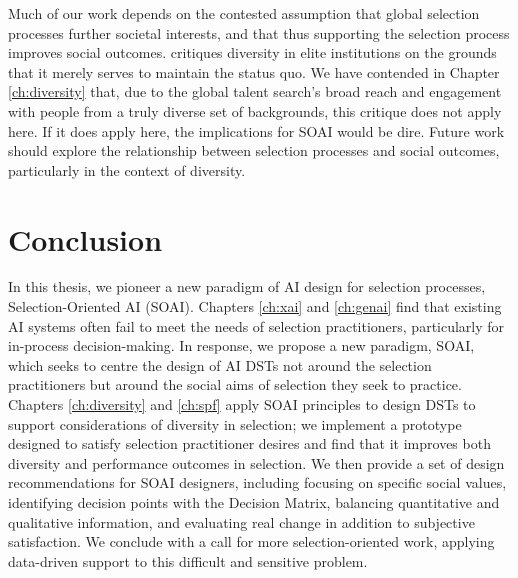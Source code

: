 Much of our work depends on the contested assumption that global selection processes further societal interests, and that thus supporting the selection process improves social outcomes. \textcite{Warikoo_2019} critiques diversity in elite institutions on the grounds that it merely serves to maintain the status quo. We have contended in Chapter \ref{ch:diversity} that, due to the global talent search's broad reach and engagement with people from a truly diverse set of backgrounds, this critique does not apply here. If it does apply here, the implications for SOAI would be dire. Future work should explore the relationship between selection processes and social outcomes, particularly in the context of diversity.

\section{Conclusion}
In this thesis, we pioneer a new paradigm of AI design for selection processes, Selection-Oriented AI (SOAI). Chapters \ref{ch:xai} and \ref{ch:genai} find that existing AI systems often fail to meet the needs of selection practitioners, particularly for in-process decision-making. In response, we propose a new paradigm, SOAI, which seeks to centre the design of AI DSTs not around the selection practitioners but around the social aims of selection they seek to practice. Chapters \ref{ch:diversity} and \ref{ch:spf} apply SOAI principles to design DSTs to support considerations of diversity in selection; we implement a prototype designed to satisfy selection practitioner desires and find that it improves both diversity and performance outcomes in selection. We then provide a set of design recommendations for SOAI designers, including focusing on specific social values, identifying decision points with the Decision Matrix, balancing quantitative and qualitative information, and evaluating real change in addition to subjective satisfaction. We conclude with a call for more selection-oriented work, applying data-driven support to this difficult and sensitive problem.